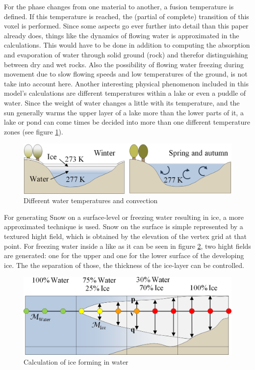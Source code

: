 For the phase changes from one material to another, a fusion temperature is defined. If this temperature is reached, the (partial of complete) transition of this voxel is performed. Since some aspects go ever further into detail than this paper already does, things like the dynamics of flowing water is approximated in the calculations. This would have to be done in addition to computing the absorption and evaporation of water through solid ground (rock) and therefor distinguishing between dry and wet rocks. Also the possibility of flowing water freezing during movement due to slow flowing speeds and low temperatures of the ground, is not take into account here. Another interesting physical phenomenon included in this model's calculations are different temperatures within a lake or even a puddle of water. Since the weight of water changes a little with its temperature, and the sun generally warms the upper layer of a lake more than the lower parts of it, a lake or pond can come times be decided into more than one different temperature zones (see figure \ref{fig:waterconvection}).

\begin{figure}[htb]
	\centering
	\includegraphics[width=\linewidth]{BF01/h_1.png}
	\caption{Different water temperatures and convection}
	\label{fig:waterconvection}
\end{figure}

For generating Snow on a surface-level or freezing water resulting in ice, a more approximated technique is used. Snow on the surface is simple represented by a textured hight field, which is obtained by the elevation of the vertex grid at that point. For freezing water inside a like as it can be seen in figure \ref{fig:iceinwater}, two hight fields are generated: one for the upper and one for the lower surface of the developing ice. The the separation of those, the thickness of the ice-layer can be controlled.

\begin{figure}[htb]
	\centering
	\includegraphics[width=\linewidth]{BF01/i_1.png}
	\caption{Calculation of ice forming in water}
	\label{fig:iceinwater}
\end{figure}

